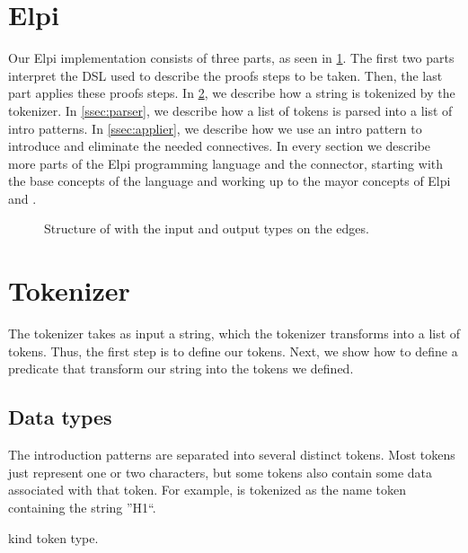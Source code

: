 \documentclass[thesis.tex]{subfiles}
\begin{document}
{\section{Elpi}\label{sec:elpi}
Our Elpi implementation  consists of three parts, as seen in \cref{fig:eiintrosstruct}. The first two parts interpret the DSL used to describe the proofs steps to be taken. Then, the last part applies these proofs steps. In \cref{ssec:tokenizer}, we describe how a string is tokenized by the tokenizer. In \cref{ssec:parser}, we describe how a list of tokens is parsed into a list of intro patterns. In \cref{ssec:applier}, we describe how we use an intro pattern to introduce and eliminate the needed connectives. In every section we describe more parts of the Elpi programming language and the \ce connector, starting with the base concepts of the language and working up to the mayor concepts of Elpi and \ce.
\begin{figure}
    \centering
    \caption{Structure of  with the input and output types on the edges.}
    \label{fig:eiintrosstruct}
\end{figure}

\section{Tokenizer}\label{ssec:tokenizer}
The tokenizer takes as input a string, which the tokenizer transforms into a list of tokens. Thus, the first step is to define our tokens. Next, we show how to define a predicate that transform our string into the tokens we defined.

\subsection{Data types}\label{sssec:datatypes}
The introduction patterns are separated into several distinct tokens. Most tokens just represent one or two characters, but some tokens also contain some data associated with that token. For example,  is tokenized as the name token containing the string ''H1``.
\begin{elpicode}
  kind token type.


\end{elpicode}}
\end{document}
